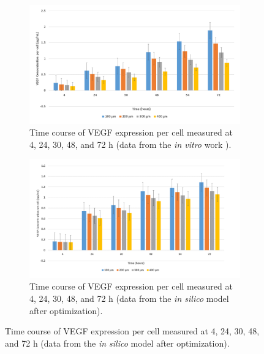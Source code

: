   \begin{figure}[!t]
  \centering


 \begin{subfigure}{.5\textwidth}
   \centering
   \includegraphics[width=.8\linewidth]{./figures/Results/In-Vitro.png}
   \caption{Time course of VEGF expression per cell measured at 4, 24, 30, 48, and 72 h (data from the \textit{in vitro} work \cite{qanitabaker:Vargis2014Effect} ).}
   \label{In-Vitro_Data}
 \end{subfigure}%


  \begin{subfigure}{.5\textwidth}
    \centering
    \includegraphics[width=.8\linewidth]{./figures/Results/After.png}
    \caption{Time course of VEGF expression per cell measured at 4, 24, 30, 48, and 72 h (data from the \textit{in silico} model after optimization).}
    \label{AfterOpt}
  \end{subfigure}%

  \end{figure}
